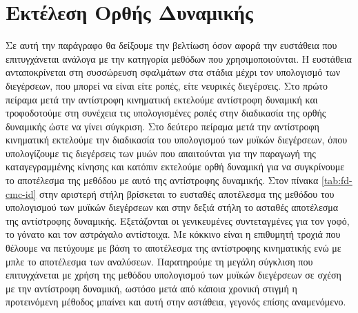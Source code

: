 \section{Εκτέλεση Ορθής Δυναμικής}

Σε αυτή την παράγραφο θα δείξουμε την βελτίωση όσον αφορά την ευστάθεια που επιτυγχάνεται ανάλογα με την κατηγορία μεθόδων που χρησιμοποιούνται. Η ευστάθεια ανταποκρίνεται στη συσσώρευση σφαλμάτων στα στάδια μέχρι τον υπολογισμό των διεγέρσεων, που μπορεί να είναι είτε ροπές, είτε νευρικές διεγέρσεις. Στο πρώτο πείραμα μετά την αντίστροφη κινηματική εκτελούμε αντίστροφη δυναμική και τροφοδοτούμε στη συνέχεια τις υπολογισμένες ροπές στην διαδικασία της ορθής δυναμικής ώστε να γίνει σύγκριση. Στο δεύτερο πείραμα μετά την αντίστροφη κινηματική εκτελούμε την διαδικασία του υπολογισμού των μυϊκών διεγέρσεων, όπου υπολογίζουμε τις διεγέρσεις των μυών που απαιτούνται για την παραγωγή της καταγεγραμμένης κίνησης και κατόπιν εκτελούμε ορθή δυναμική για να συγκρίνουμε το αποτέλεσμα της μεθόδου με αυτό της αντίστροφης δυναμικής. Στον πίνακα \ref{tab:fd-cmc-id} στην αριστερή στήλη βρίσκεται το ευσταθές αποτέλεσμα της μεθόδου του υπολογισμού των μυϊκών διεγέρσεων και στην δεξιά στήλη το ασταθές αποτέλεσμα της αντίστροφης δυναμικής. Εξετάζονται οι γενικευμένες συντεταγμένες για τον γοφό, το γόνατο και τον αστράγαλο αντίστοιχα. Με κόκκινο είναι η επιθυμητή τροχιά που θέλουμε να πετύχουμε με βάση το αποτέλεσμα της αντίστροφης κινηματικής ενώ με μπλε το αποτέλεσμα των αναλύσεων. Παρατηρούμε τη μεγάλη σύγκλιση που επιτυγχάνεται με χρήση της μεθόδου υπολογισμού των μυϊκών διεγέρσεων σε σχέση με την αντίστροφη δυναμική, ωστόσο μετά από κάποια χρονική στιγμή η προτεινόμενη μέθοδος μπαίνει και αυτή στην αστάθεια, γεγονός επίσης αναμενόμενο.

